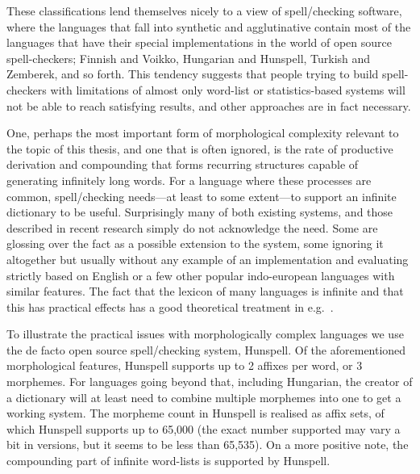 \documentclass[officiallayout]{unihelcompling}
\begin{document}
These classifications lend themselves nicely to a view of
spell\-/checking software, where the languages that fall into synthetic and
agglutinative contain most of the languages that have their special
implementations in the world of open source spell-checkers; Finnish and Voikko,
Hungarian and Hunspell, Turkish and Zemberek, and so forth.  This tendency
suggests that people trying to build spell-checkers with limitations of
almost only word-list or statistics-based systems will not be able to reach
satisfying results, and other approaches are in fact necessary.

One, perhaps the most important form of morphological complexity relevant to
the topic of this thesis, and one that is often ignored, is the rate of
productive derivation and compounding that forms recurring structures capable
of generating infinitely long words. For a language where these processes are
common, spell\-/checking needs---at least to some extent---to support an infinite
dictionary to be useful. Surprisingly many of both existing systems, and those
described in recent research simply do not acknowledge the need. Some are
glossing over the fact as a possible extension to the system, some ignoring it
altogether but usually without any example of an implementation and evaluating
strictly based on English or a few other popular indo-european languages with
similar features.  The fact that the lexicon of many languages is infinite and
that this has practical effects has a good theoretical treatment in
e.g.~\citet{kornai2002many}.

To illustrate the practical issues with morphologically complex languages we
use the de facto open source spell\-/checking system, Hunspell. Of the
aforementioned morphological features, Hunspell supports up to 2 affixes per
word, or 3 morphemes. For languages going beyond that, including Hungarian, the
creator of a dictionary will at least need to combine multiple morphemes into
one to get a working system. The morpheme count in Hunspell is realised as
affix sets, of which Hunspell supports up to 65,000 (the exact number supported
may vary a bit in versions, but it seems to be less than 65,535). On a more
positive note, the compounding part of infinite word-lists is supported by
Hunspell.
\end{document}
